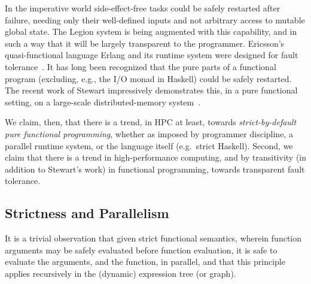 \documentclass{llncs}
\begin{document}
In the imperative world side-effect-free tasks could be safely restarted after
failure, needing only their well-defined inputs and not arbitrary access to
mutable global state.  The Legion system is being augmented with this
capability, and in such a way that it will be largely transparent to the
programmer.  Ericsson's quasi-functional language Erlang and its runtime
system were designed for fault tolerance~\cite{Cesarini:2009}.  It has long
been recognized that the pure parts of a functional program (excluding, e.g.,
the I/O monad in Haskell) could be safely restarted.  The recent work of
Stewart impressively demonstrates this, in a pure functional setting, on a
large-scale distributed-memory system~\cite{Stewart:2013}.

We claim, then, that there is a trend, in HPC at least, towards
\emph{strict-by-default pure functional programming}, whether as imposed by
programmer discipline, a parallel runtime system, or the language itself
(e.g.\ strict Haskell).  Second, we claim that there is a trend in
high-performance computing, and by transitivity (in addition to Stewart's
work) in functional programming, towards transparent fault tolerance.

\subsection{Strictness and Parallelism}
It is a trivial observation that given strict functional semantics, wherein
function arguments may be safely evaluated before function evaluation, it is
safe to evaluate the arguments, and the function, in parallel, and that this
principle applies recursively in the (dynamic) expression tree (or graph).
\end{document}
